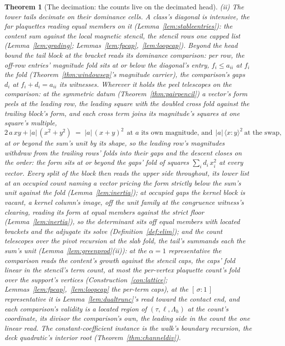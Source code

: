 \documentclass[11pt]{article}
\newtheorem{theorem}{Theorem}
\theoremstyle{definition}
\begin{document}
\begin{theorem}[The decimation: the counts live on the decimated head]
\emph{(ii) The tower tails decimate on their dominance cells.} A class's
diagonal is intensive, the far plaquettes reading equal members on it
(Lemma~\ref{lem:stableentries}): the content sum against the local
magnetic stencil, the stencil rows one capped list
(Lemma~\ref{lem:grading}; Lemmas~\ref{lem:fpcap},~\ref{lem:loopcap}).
Beyond the head bound the tail block at the bracket reads its
\emph{dominance comparison}: per row, the off-row entries' magnitude
fold sits at or below the diagonal's entry, $f_i\le a_{ii}$ at $f_i$
the fold (Theorem~\ref{thm:windowsep}'s magnitude carrier), the
comparison's gaps $d_i$ at $f_i+d_i=a_{ii}$ its witnesses.  Wherever
it holds the peel telescopes on the comparison: at the symmetric
datum (Theorem~\ref{thm:pairpencil}) a vector's form peels at the
leading row, the leading square with the doubled cross fold against
the trailing block's form, and each cross term joins its magnitude's
squares at one square's multiple,
\[
2\,a\,xy+|a|\,(x^2+y^2)\;=\;|a|\,(x+y)^2\ \ \text{at $a$ its own
magnitude, and}\ \ |a|\,\langle x\!:\!y\rangle^2\ \text{at the swap,}
\]
at or beyond the sum's unit by its shape, so the leading row's
magnitudes withdraw from the trailing rows' folds into their gaps
and the descent closes on the order: the form sits at or beyond the
gaps' fold of squares $\sum_id_i\,x_i^2$ at every vector.  Every
split of the block then reads the upper side throughout, its lower
list at an occupied count naming a vector pricing the form strictly
below the sum's unit against the fold (Lemma~\ref{lem:inertia}); at
occupied gaps the kernel block is vacant, a kernel column's image,
off the unit family at the congruence witness's clearing, reading
its form at equal members against the strict floor
(Lemma~\ref{lem:inertia}), so the determinant sits off equal members
with located brackets and the adjugate its solve
(Definition~\ref{def:elim}); and the count telescopes over the pivot
recursion at the slab fold, the tail's summands each the sum's unit
(Lemma~\ref{lem:greenprod}(ii)): at the $\alpha{=}1$ representative the
comparison reads the content's growth against the stencil caps, the
caps' fold linear in the stencil's term count, at most the
per-vertex plaquette count's fold over the support's vertices
(Construction~\ref{con:lattice};
Lemmas~\ref{lem:fpcap},~\ref{lem:loopcap} the per-term caps), at the
$[\,\sigma:1\,]$ representative it is Lemma~\ref{lem:dualtrunc}'s read
toward the contact end, and each
comparison's validity is a located region of $(\tau,\ell,\Lambda_h)$
at the count's coordinate,
its divisor the comparison's own, the leading side in the count the
one linear read. The constant-coefficient instance is
the walk's boundary recursion, the deck quadratic's interior root
(Theorem~\ref{thm:channeldiv}).


\end{theorem}
\end{document}
